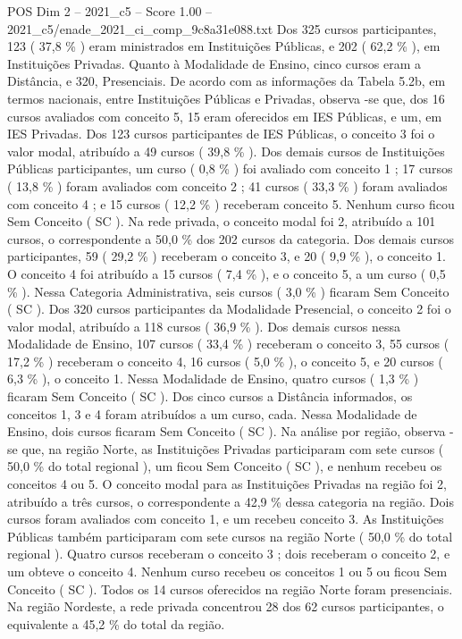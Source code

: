 \begin{textsample}{POS Dim 2 – 2021\_c5 – Score 1.00 – 2021\_c5/enade\_2021\_ci\_comp\_9c8a31e088.txt}
Dos 325 cursos participantes, 123 ( 37,8 \% ) eram ministrados em Instituições Públicas, e 202 ( 62,2 \% ), em Instituições Privadas.
Quanto à Modalidade de Ensino, cinco cursos eram a Distância, e 320, Presenciais.
De acordo com as informações da Tabela 5.2b, em termos nacionais, entre Instituições Públicas e Privadas, observa -se que, dos 16 cursos avaliados com conceito 5, 15 eram oferecidos em IES Públicas, e um, em IES Privadas.
Dos 123 cursos participantes de IES Públicas, o conceito 3 foi o valor modal, atribuído a 49 cursos ( 39,8 \% ).
Dos demais cursos de Instituições Públicas participantes, um curso ( 0,8 \% ) foi avaliado com conceito 1 ; 17 cursos ( 13,8 \% ) foram avaliados com conceito 2 ; 41 cursos ( 33,3 \% ) foram avaliados com conceito 4 ; e 15 cursos ( 12,2 \% ) receberam conceito 5.
Nenhum curso ficou Sem Conceito ( SC ).
Na rede privada, o conceito modal foi 2, atribuído a 101 cursos, o correspondente a 50,0 \% dos 202 cursos da categoria.
Dos demais cursos participantes, 59 ( 29,2 \% ) receberam o conceito 3, e 20 ( 9,9 \% ), o conceito 1.
O conceito 4 foi atribuído a 15 cursos ( 7,4 \% ), e o conceito 5, a um curso ( 0,5 \% ).
Nessa Categoria Administrativa, seis cursos ( 3,0 \% ) ficaram Sem Conceito ( SC ).
Dos 320 cursos participantes da Modalidade Presencial, o conceito 2 foi o valor modal, atribuído a 118 cursos ( 36,9 \% ).
Dos demais cursos nessa Modalidade de Ensino, 107 cursos ( 33,4 \% ) receberam o conceito 3, 55 cursos ( 17,2 \% ) receberam o conceito 4, 16 cursos ( 5,0 \% ), o conceito 5, e 20 cursos ( 6,3 \% ), o conceito 1.
Nessa Modalidade de Ensino, quatro cursos ( 1,3 \% ) ficaram Sem Conceito ( SC ).
Dos cinco cursos a Distância informados, os conceitos 1, 3 e 4 foram atribuídos a um curso, cada.
Nessa Modalidade de Ensino, dois cursos ficaram Sem Conceito ( SC ).
Na análise por região, observa -se que, na região Norte, as Instituições Privadas participaram com sete cursos ( 50,0 \% do total regional ), um ficou Sem Conceito ( SC ), e nenhum recebeu os conceitos 4 ou 5.
O conceito modal para as Instituições Privadas na região foi 2, atribuído a três cursos, o correspondente a 42,9 \% dessa categoria na região.
Dois cursos foram avaliados com conceito 1, e um recebeu conceito 3.
As Instituições Públicas também participaram com sete cursos na região Norte ( 50,0 \% do total regional ).
Quatro cursos receberam o conceito 3 ; dois receberam o conceito 2, e um obteve o conceito 4.
Nenhum curso recebeu os conceitos 1 ou 5 ou ficou Sem Conceito ( SC ).
Todos os 14 cursos oferecidos na região Norte foram presenciais.
Na região Nordeste, a rede privada concentrou 28 dos 62 cursos participantes, o equivalente a 45,2 \% do total da região.

\end{textsample}
